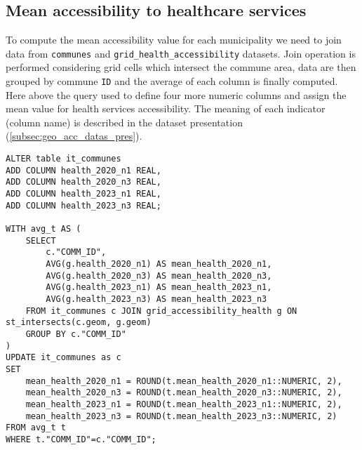 \subsection{Mean accessibility to healthcare services}

To compute the mean accessibility value for each municipality we need to join data from \texttt{communes} and \texttt{grid\_health\_accessibility} datasets.
Join operation is performed considering grid cells which intersect the commune area, data are then grouped by commune \texttt{ID} and the average of each column is finally computed.
Here above the query used to define four more numeric columns and assign the mean value for health services accessibility.
The meaning of each indicator (column name) is described in the dataset presentation (\ref{subsec:geo_acc_datas_pres}).

\begin{verbatim}
ALTER table it_communes
ADD COLUMN health_2020_n1 REAL,
ADD COLUMN health_2020_n3 REAL,
ADD COLUMN health_2023_n1 REAL,
ADD COLUMN health_2023_n3 REAL;
	
WITH avg_t AS (
	SELECT
		c."COMM_ID",
		AVG(g.health_2020_n1) AS mean_health_2020_n1,
		AVG(g.health_2020_n3) AS mean_health_2020_n3,
		AVG(g.health_2023_n1) AS mean_health_2023_n1,
		AVG(g.health_2023_n3) AS mean_health_2023_n3
	FROM it_communes c JOIN grid_accessibility_health g ON st_intersects(c.geom, g.geom)
	GROUP BY c."COMM_ID"
)
UPDATE it_communes as c
SET
	mean_health_2020_n1 = ROUND(t.mean_health_2020_n1::NUMERIC, 2),
	mean_health_2020_n3 = ROUND(t.mean_health_2020_n3::NUMERIC, 2),
	mean_health_2023_n1 = ROUND(t.mean_health_2023_n1::NUMERIC, 2),
	mean_health_2023_n3 = ROUND(t.mean_health_2023_n3::NUMERIC, 2)
FROM avg_t t
WHERE t."COMM_ID"=c."COMM_ID";
\end{verbatim}


